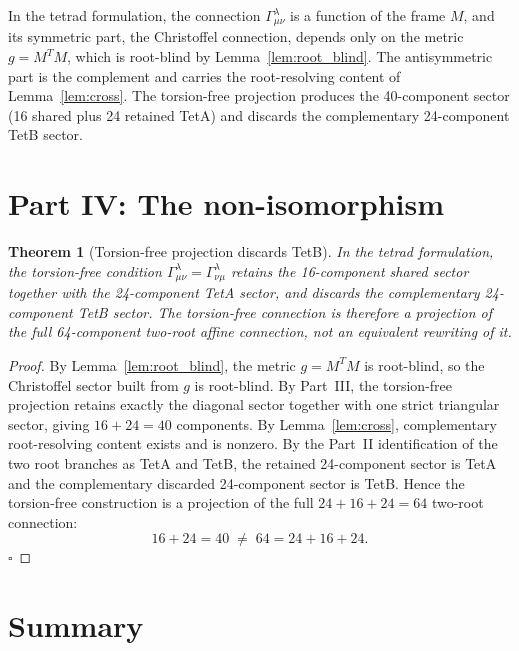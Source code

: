 \documentclass[twocolumn]{iopjournal}
\newtheorem{theorem}[lemma]{Theorem}
\theoremstyle{definition}
\begin{document}
In the tetrad formulation, the connection $\Gamma^\lambda_{\mu\nu}$
is a function of the frame $M$, and its symmetric part, the
Christoffel connection, depends only on the metric $g = M^T M$,
which is root-blind by Lemma~\ref{lem:root_blind}.  The antisymmetric
part is the complement and carries the root-resolving content of
Lemma~\ref{lem:cross}.  The torsion-free projection produces the
40-component sector (16 shared plus 24 retained TetA) and discards
the complementary 24-component TetB sector.


\section*{Part IV: The non-isomorphism}

\begin{theorem}[Torsion-free projection discards TetB]
\label{thm:noniso}
In the tetrad formulation, the torsion-free condition
$\Gamma^\lambda_{\mu\nu} = \Gamma^\lambda_{\nu\mu}$ retains the
16-component shared sector together with the 24-component TetA
sector, and discards the complementary 24-component TetB sector.
The torsion-free connection is therefore a projection of the full
64-component two-root affine connection, not an equivalent
rewriting of it.
\end{theorem}

\begin{proof}
By Lemma~\ref{lem:root_blind}, the metric $g = M^T M$ is root-blind,
so the Christoffel sector built from $g$ is root-blind.  By
Part~III, the torsion-free projection retains exactly the diagonal
sector together with one strict triangular sector, giving
$16 + 24 = 40$ components.  By Lemma~\ref{lem:cross}, complementary
root-resolving content exists and is nonzero.  By the Part~II
identification of the two root branches as TetA and TetB, the
retained 24-component sector is TetA and the complementary
discarded 24-component sector is TetB.  Hence the torsion-free
construction is a projection of the full $24 + 16 + 24 = 64$
two-root connection:
\begin{equation}
  \boxed{16 + 24 = 40 \;\neq\; 64 = 24 + 16 + 24.}
  \label{eq:noniso}
\end{equation}
\hfill$\square$
\end{proof}


\section*{Summary}
\end{document}
